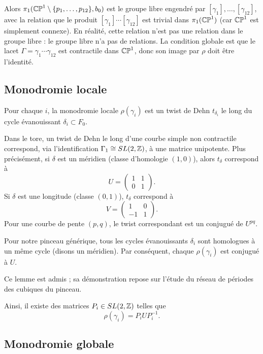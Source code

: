 Alors $\pi_1(\mathbb{CP}^1 \setminus \{p_1,\dots,p_{12}\}, b_0)$ est le groupe libre engendré par $[\gamma_1], \dots, [\gamma_{12}]$, avec la relation que le produit $[\gamma_1] \cdots [\gamma_{12}]$ est trivial dans $\pi_1(\mathbb{CP}^1)$ (car $\mathbb{CP}^1$ est simplement connexe). En réalité, cette relation n'est pas une relation dans le groupe libre : le groupe libre n'a pas de relations. La condition globale est que le lacet $\Gamma = \gamma_1 \cdots \gamma_{12}$ est contractile dans $\mathbb{CP}^1$, donc son image par $\rho$ doit être l'identité.

\subsection{Monodromie locale}

Pour chaque $i$, la monodromie locale $\rho(\gamma_i)$ est un twist de Dehn $t_{\delta_i}$ le long du cycle évanouissant $\delta_i \subset F_0$.

Dans le tore, un twist de Dehn le long d'une courbe simple non contractile correspond, via l'identification $\Gamma_1 \cong SL(2,\mathbb{Z})$, à une matrice unipotente. Plus précisément, si $\delta$ est un méridien (classe d'homologie $(1,0)$), alors $t_\delta$ correspond à
\[
U = \begin{pmatrix} 1 & 1 \\ 0 & 1 \end{pmatrix}.
\]
Si $\delta$ est une longitude (classe $(0,1)$), $t_\delta$ correspond à
\[
V = \begin{pmatrix} 1 & 0 \\ -1 & 1 \end{pmatrix}.
\]
Pour une courbe de pente $(p,q)$, le twist correspondant est un conjugué de $U^{pq}$.

\begin{lemme}
Pour notre pinceau générique, tous les cycles évanouissants $\delta_i$ sont homologues à un même cycle (disons un méridien). Par conséquent, chaque $\rho(\gamma_i)$ est conjugué à $U$.
\end{lemme}

Ce lemme est admis ; sa démonstration repose sur l'étude du réseau de périodes des cubiques du pinceau.

Ainsi, il existe des matrices $P_i \in SL(2,\mathbb{Z})$ telles que
\[
\rho(\gamma_i) = P_i U P_i^{-1}.
\]

\subsection{Monodromie globale}

